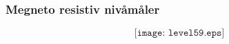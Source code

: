 \documentclass[aspectratio=169,xcolor=dvipsnames]{beamer}
\begin{document}
%
\begin{frame}
	\frametitle{Megneto resistiv nivåmåler}

$$\texttt{[image: level59.eps]}$$
\end{frame}
%
%
%
%
%
%
%
%
%
%
\end{document}
